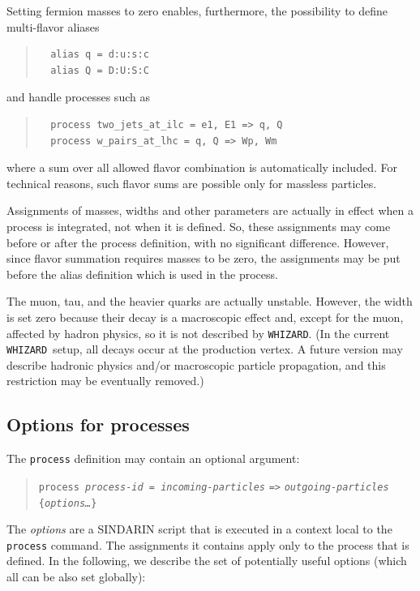 \documentclass[12pt]{book}
\newcommand{\ttt}[1]{\texttt{#1}}
\newcommand{\whizard}{\texttt{WHIZARD}}
\begin{document}
Setting fermion masses to zero enables, furthermore, the possibility to define
multi-flavor aliases
\begin{quote}
\begin{footnotesize}
\begin{verbatim}
  alias q = d:u:s:c
  alias Q = D:U:S:C  
\end{verbatim}
\end{footnotesize}
\end{quote}
and handle processes such as
\begin{quote}
\begin{footnotesize}
\begin{verbatim}
  process two_jets_at_ilc = e1, E1 => q, Q
  process w_pairs_at_lhc = q, Q => Wp, Wm  
\end{verbatim}
\end{footnotesize}
\end{quote}
where a sum over all allowed flavor combination is automatically included.
For technical reasons, such flavor sums are possible only for massless
particles. 

Assignments of masses, widths and other parameters are actually in effect when
a process is integrated, not when it is defined.  So, these assignments may
come before or after the process definition, with no significant difference.
However, since flavor summation requires masses to be zero, the assignments
may be put before the alias definition which is used in the process.

The muon, tau, and the heavier quarks are actually unstable.  However, the
width is set zero because their decay is a macroscopic effect and, except for
the muon, affected by hadron physics, so it is not described by \whizard.  (In
the current \whizard\ setup, all decays occur at the production vertex.  A
future version may describe hadronic physics and/or macroscopic particle
propagation, and this restriction may be eventually removed.)




\subsection{Options for processes}
\label{sec:process options}

The \ttt{process} definition may contain an optional argument:
\begin{quote}
\begin{footnotesize}
  \ttt{process \textit{process-id} = \textit{incoming-particles}} \verb|=>|
  \ttt{\textit{outgoing-particles}} \ttt{\{\textit{options\ldots}\}}
\end{footnotesize}
\end{quote}
The \textit{options} are a SINDARIN script that is executed in a context local
to the \ttt{process} command.  The assignments it contains apply only to the
process that is defined. In the following, we describe the set of potentially
useful options (which all can be also set globally):
\end{document}
